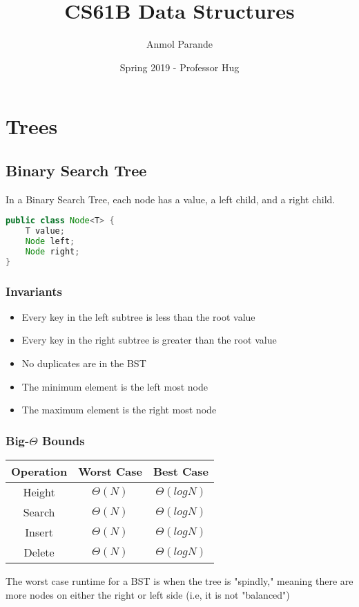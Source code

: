 \documentclass{article}
\begin{document}
    \title{CS61B Data Structures}
    \author{Anmol Parande}
    \date{Spring 2019 - Professor Hug}
    \maketitle

\section{Trees}
\subsection{Binary Search Tree}
In a Binary Search Tree, each node has a value, a left child, and a right child.
\begin{lstlisting}[language=Java]
public class Node<T> {
    T value;
    Node left;
    Node right;
}
\end{lstlisting}
\subsubsection{Invariants}
\begin{itemize}
    \item Every key in the left subtree is less than the root value
    \item Every key in the right subtree is greater than the root value
    \item No duplicates are in the BST
    \item The minimum element is the left most node
    \item The maximum element is the right most node
\end{itemize}
\subsubsection{Big-$\Theta$ Bounds}
\begin{center}
    \begin{tabular}{ c | c | c }
     Operation & Worst Case & Best Case\\
     \hline
     Height & $\Theta(N)$ & $\Theta(log N)$ \\ 
     Search & $\Theta(N)$ & $\Theta(log N)$ \\  
     Insert & $\Theta(N)$ & $\Theta(log N)$ \\
     Delete & $\Theta(N)$ & $\Theta(log N)$    
    \end{tabular}
\end{center}
The worst case runtime for a BST is when the tree is "spindly," meaning there are more nodes on either the right or left side (i.e, it is not "balanced")
\end{document}
